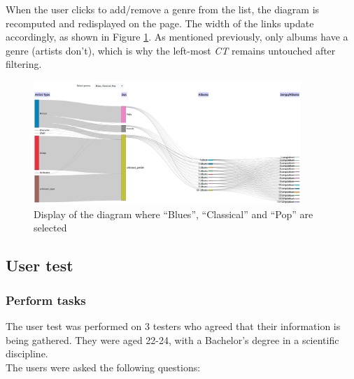 \documentclass[a4paper, 11pt, oneside]{article}
\newcommand{\ct}{\textit{CT }}
\begin{document}
When the user clicks to add/remove a genre from the list, the diagram is recomputed and redisplayed on the page. The width of the links update accordingly, as shown in Figure \ref{fig:joris_sankey_filter-result}. As mentioned previously, only albums have a genre (artists don't), which is why the left-most \ct remains untouched after filtering.

\begin{figure}[ht]
    \centering
    \includegraphics[width=0.9\textwidth]{Images/joris-sankey-filter-result.png}
    \caption{Display of the diagram where ``Blues'', ``Classical'' and ``Pop'' are selected}
    \label{fig:joris_sankey_filter-result}
\end{figure}

\subsection{User test}
\subsubsection{Perform tasks}

The user test was performed on 3 testers who agreed that their information is being gathered. They were aged 22-24, with a Bachelor's degree in a scientific discipline.\\
The users were asked the following questions: 
\end{document}
